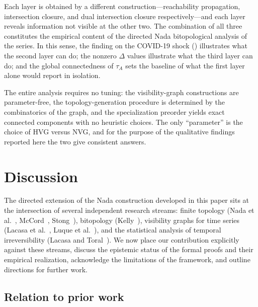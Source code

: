 \documentclass[11pt,a4paper]{article}
\theoremstyle{plain}
\theoremstyle{definition}
\begin{document}
Each layer is obtained by a different construction---reachability
propagation, intersection closure, and dual intersection closure
respectively---and each layer reveals information not visible at the
other two. The combination of all three constitutes the empirical
content of the directed Nada bitopological analysis of the series.
In this sense, the finding on the COVID-19 shock
() illustrates what the second layer can do;
the nonzero $\Delta$ values illustrate what the third layer can do; and
the global connectedness of $\tau_A$ sets the baseline of what the first
layer alone would report in isolation.

The entire analysis requires no tuning: the visibility-graph
constructions are parameter-free, the topology-generation procedure is
determined by the combinatorics of the graph, and the specialization
preorder yields exact connected components with no heuristic choices.
The only ``parameter'' is the choice of HVG versus NVG, and for the
purpose of the qualitative findings reported here the two give
consistent answers.


\section{Discussion}\label{sec:discussion}

The directed extension of the Nada construction developed in this paper
sits at the intersection of several independent research streams: finite
topology (Nada et al.~\cite{Nada2018}, McCord~\cite{McCord1966},
Stong~\cite{Stong1966}), bitopology (Kelly~\cite{Kelly1963}), visibility
graphs for time series (Lacasa et al.~\cite{Lacasa2008},
Luque et al.~\cite{Luque2009}), and the statistical analysis of temporal
irreversibility (Lacasa and Toral~\cite{LacasaToral2010}). We now place
our contribution explicitly against these streams, discuss the epistemic
status of the formal proofs and their empirical realization, acknowledge
the limitations of the framework, and outline directions for further
work.

\subsection{Relation to prior work}\label{subsec:relation-prior}
\end{document}

